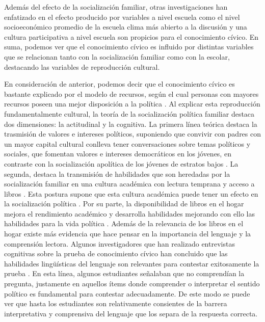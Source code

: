 \documentclass[12pt,twoside]{templates/facsothesis}
\begin{document}
Además del efecto de la socialización familiar, otras investigaciones han enfatizado en el efecto producido por variables a nivel escuela como el nivel socioeconómico promedio de la escuela clima más abierto a la discusión y una cultura participativa a nivel escuela son propicios para el conocimiento cívico. En suma, podemos ver que el conocimiento cívico es influido por distintas variables que se relacionan tanto con la socialización familiar como con la escolar, destacando las variables de reproducción cultural.

En consideración de anterior, podemos decir que el conocimiento cívico es bastante explicado por el modelo de recursos, según el cual personas con mayores recursos poseen una mejor disposición a la política \citep{miranda_Desigualdad_2015}. Al explicar esta reproducción fundamentalmente cultural, la teoría de la socialización política familiar destaca dos dimensiones: la actitudinal y la cognitiva. La primera línea teórica destaca la trasmisión de valores e intereses políticos, suponiendo que convivir con padres con un mayor capital cultural conlleva tener conversaciones sobre temas políticos y sociales, que fomentan valores e intereses democráticos en los jóvenes, en contraste con la socialización apolítica de los jóvenes de estratos bajos \citep{gimpel_Cultivating_2003, wasburn_Making_2017}. La segunda, destaca la transmisión de habilidades que son heredadas por la socialización familiar en una cultura académica con lectura temprana y acceso a libros \citep{evans_Scholarly_2015, park_Home_2008}. Esta postura supone que esta cultura académica puede tener un efecto en la socialización política \citep{duarte_influence_2017, boeve-depauw_crossnational_2010}. Por su parte, la disponibilidad de libros en el hogar mejora el rendimiento académico y desarrolla habilidades mejorando con ello las habilidades para la vida política \citep{evans_Scholarly_2015}.
Además de la relevancia de los libros en el hogar existe más evidencia que hace pensar en la importancia del lenguaje y la comprensión lectora. Algunos investigadores que han realizado entrevistas cognitivas sobre la prueba de conocimiento cívico han concluido que las habilidades lingüísticas del lenguaje son relevantes para contestar exitosamente la prueba \citep{zhang_Understanding_2015, arensmeier_Swedish_2015}. En esta línea, algunos estudiantes señalaban que no comprendían la pregunta, justamente en aquellos ítems donde comprender o interpretar el sentido político es fundamental para contestar adecuadamente. De este modo se puede ver que hasta los estudiantes son relativamente consientes de la barrera interpretativa y comprensiva del lenguaje que los separa de la respuesta correcta.
\end{document}
